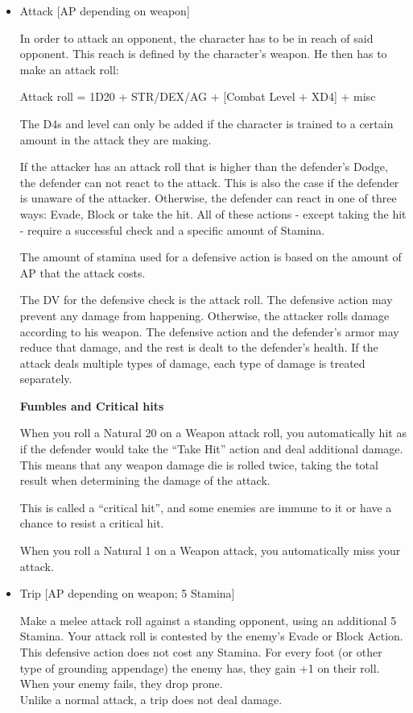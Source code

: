 \begin{itemize}

\item Attack [AP depending on weapon]

In order to attack an opponent, the character has to be in reach of said opponent. This reach is defined by the character's weapon. He then has to make an attack roll:

Attack roll = 1D20 + STR/DEX/AG + [Combat Level + XD4] + misc

The D4s and level can only be added if the character is trained to a certain amount in the attack they are making.

If the attacker has an attack roll that is higher than the defender's Dodge, the defender can not react to the attack. This is also the case if the defender is unaware of the attacker. Otherwise, the defender can react in one of three ways: Evade, Block or take the hit. All of these actions - except taking the hit - require a successful check and a specific amount of Stamina.

The amount of stamina used for a defensive action is based on the amount of  AP that the attack costs. 

The DV for the defensive check is the attack roll. The defensive action may prevent any damage from happening. Otherwise, the attacker rolls damage according to his weapon. The defensive action and the defender's armor may reduce that damage, and the rest is dealt to the defender's health. If the attack deals multiple types of damage, each type of damage is treated separately. 

\textbf{Fumbles and Critical hits}

When you roll a Natural 20 on a Weapon attack roll, you automatically hit as if the defender would take the “Take Hit” action and deal additional damage. This means that any weapon damage die is rolled twice, taking the total result when determining the damage of the attack.

This is called a “critical hit”, and some enemies are immune to it or have a chance to resist a critical hit.

When you roll a Natural 1 on a Weapon attack, you automatically miss your attack.


\item Trip [AP depending on weapon; 5 Stamina]

Make a melee attack roll against a standing opponent, using an additional 5 Stamina. Your attack roll is contested by the enemy's Evade or Block Action. This defensive action does not cost any Stamina. For every foot (or other type of grounding appendage) the enemy has, they gain +1 on their roll. When your enemy fails, they drop prone.\\
Unlike a normal attack, a trip does not deal damage.\\



\end{itemize}
